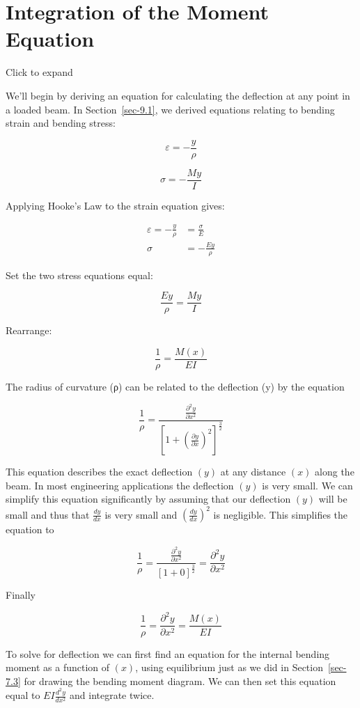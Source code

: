 \documentclass[
  letterpaper,
  DIV=11,
  numbers=noendperiod]{scrreprt}
\theoremstyle{definition}
\theoremstyle{remark}
\begin{document}
\section{Integration of the Moment Equation}\label{sec-11.1}

Click to expand

We'll begin by deriving an equation for calculating the deflection at
any point in a loaded beam. In Section~\ref{sec-9.1}, we derived
equations relating to bending strain and bending stress:

\[
\varepsilon=-\frac{y}{\rho}
\]

\[
\sigma=-\frac{My}{I}
\]

Applying Hooke's Law to the strain equation gives:

\[
\begin{aligned}
\varepsilon=-\frac{y}{\rho}&=\frac{\sigma}{E} \\
\sigma&=-\frac{Ey}{\rho}
\end{aligned}
\]

Set the two stress equations equal:

\[
\frac{E y}{\rho}=\frac{M y}{I}
\]

Rearrange:

\[
\frac{1}{\rho}=\frac{M(x)}{E I}
\]

The radius of curvature (ρ) can be related to the deflection (y) by the
equation

\[
\frac{1}{\rho}=\frac{\frac{\partial^{2} y}{\partial x^{2}}}{\left[1+\left(\frac{\partial y}{\partial x}\right)^{2}\right]^{\frac{3}{2}}}
\]

This equation describes the exact deflection \((y)\) at any distance
\((x)\) along the beam. In most engineering applications the deflection
\((y)\) is very small. We can simplify this equation significantly by
assuming that our deflection \((y)\) will be small and thus that
\(\frac{d y}{d x}\) is very small and
\(\left(\frac{d y}{d x}\right)^{2}\) is negligible. This simplifies the
equation to

\[
\frac{1}{\rho}=\frac{\frac{\partial^{2} y}{\partial x^{2}}}{[1+0]^{\frac{3}{2}}}=\frac{\partial^{2} y}{\partial x^{2}}
\]

Finally

\[
\frac{1}{\rho}=\frac{\partial^{2} y}{\partial x^{2}}=\frac{M(x)}{E I}
\]

To solve for deflection we can first find an equation for the internal
bending moment as a function of \((x)\), using equilibrium just as we
did in Section~\ref{sec-7.3} for drawing the bending moment diagram. We
can then set this equation equal to \(E I \frac{d^{2} y}{d x^{2}}\) and
integrate twice.
\end{document}
